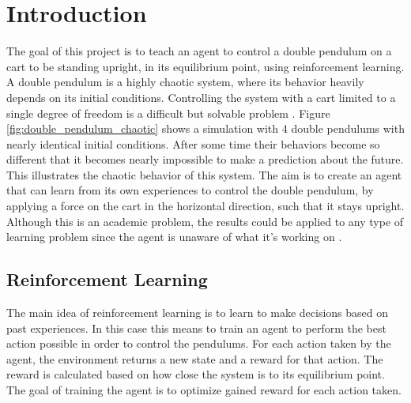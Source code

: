 \documentclass{LTHtwocol} %
\begin{document}
\section{Introduction}
The goal of this project is to teach an agent to control a double pendulum on a cart to be standing upright, in its equilibrium point, using reinforcement learning.
A double pendulum is a highly chaotic system, where its behavior heavily depends on its initial conditions.
Controlling the system with a cart limited to a single degree of freedom is a difficult but solvable problem \cite{Classic_Control_Theory}.
Figure \ref{fig:double_pendulum_chaotic} shows a simulation with 4 double pendulums with nearly identical initial conditions.
After some time their behaviors become so different that it becomes nearly impossible to make a prediction about the future.
This illustrates the chaotic behavior of this system.
The aim is to create an agent that can learn from its own experiences to control the double pendulum, by applying a force on the cart in the horizontal direction, such that it stays upright.
Although this is an academic problem, the results could be applied to any type of learning problem since the agent is unaware of what it's working on \cite{Deep_Q_Learning_First}.


\subsection{Reinforcement Learning}
The main idea of reinforcement learning is to learn to make decisions based on past experiences.
In this case this means to train an agent to perform the best action possible in order to control the pendulums.
For each action taken by the agent, the environment returns a new state and a reward for that action.
The reward is calculated based on how close the system is to its equilibrium point.
The goal of training the agent is to optimize gained reward for each action taken.
\end{document}
